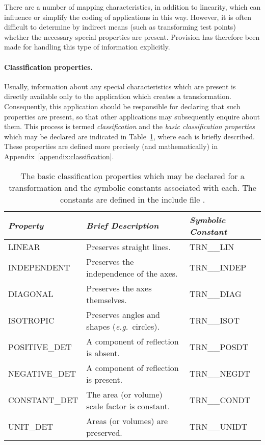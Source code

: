 There are a number of mapping characteristics, in addition to linearity,
which can influence or simplify the coding of applications in this way.
However, it is often difficult to determine by indirect means (such as
transforming test points) whether the necessary special properties are
present. 
Provision has therefore been made for handling this type of information
explicitly. 

\paragraph{Classification properties.}
Usually, information about any special characteristics which are present is
directly available only to the application which creates a transformation. 
Consequently, this application should be responsible for declaring that such
properties are present, so that other applications may subsequently enquire
about them. 
This process is termed {\em classification} and the {\em basic classification
properties} which may be declared are indicated in
Table~\ref{table:classification}, where each is briefly described. 
These properties are defined more precisely (and mathematically) in
Appendix~\ref{appendix:classification}. 

\begin{table}
\begin{center}

\begin{tabular}{|l|l|l|}
\hline
{\em Property} & {\em Brief Description} & {\em Symbolic Constant} 
\\ \hline
LINEAR & Preserves straight lines. & TRN\_\_LIN \\
INDEPENDENT & Preserves the independence of the axes. & TRN\_\_INDEP \\
DIAGONAL & Preserves the axes themselves. & TRN\_\_DIAG \\
ISOTROPIC & Preserves angles and shapes ({\em e.g.}\ circles). & TRN\_\_ISOT \\
POSITIVE\_DET & A component of reflection is absent. & TRN\_\_POSDT \\
NEGATIVE\_DET & A component of reflection is present. & TRN\_\_NEGDT \\
CONSTANT\_DET & The area (or volume) scale factor is constant. & TRN\_\_CONDT \\
UNIT\_DET & Areas (or volumes) are preserved. & TRN\_\_UNIDT \\
\hline
\end{tabular}

\caption{The basic classification properties which may be declared for a
transformation and the symbolic constants associated with each. 
The constants are defined in the include file .}

\label{table:classification}

\end{center}
\end{table}

